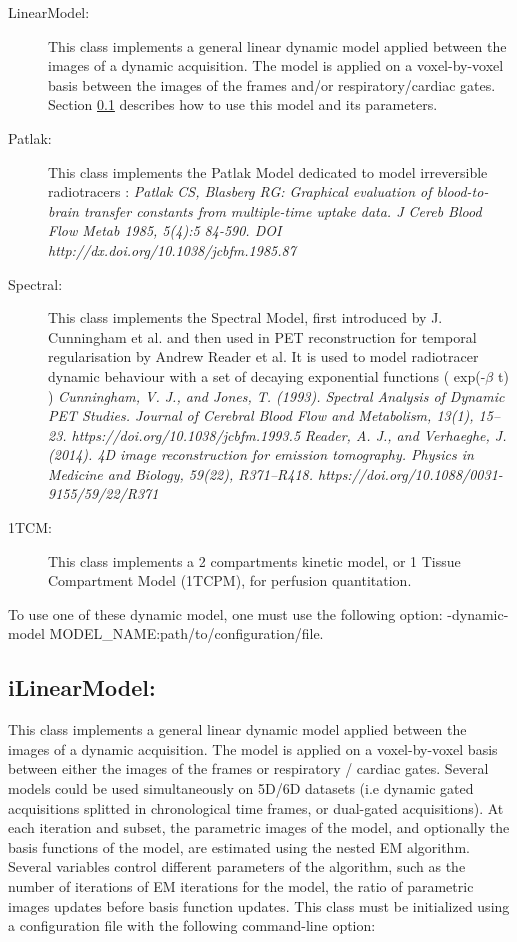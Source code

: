 \documentclass[a4paper, 11pt]{article}
\begin{document}
\begin{description}
  \item[LinearModel:]
This class implements a general linear dynamic model applied between the images of a dynamic acquisition. The model is applied on a voxel-by-voxel basis between the images of the frames and/or respiratory/cardiac gates. Section \ref{ss_lmodel} describes how to use this model and its parameters.

  \item[Patlak:]
This class implements the Patlak Model dedicated to model irreversible radiotracers : \textit{Patlak CS, Blasberg RG: Graphical evaluation of blood-to-brain transfer constants from multiple-time uptake data. J Cereb Blood Flow Metab 1985, 5(4):5 84-590. \newline DOI http://dx.doi.org/10.1038/jcbfm.1985.87}

  \item[Spectral:]
This class implements the Spectral Model, first introduced by J. Cunningham et al. and then used in PET reconstruction for temporal regularisation by Andrew Reader et al. It is used to model radiotracer dynamic behaviour with a set of decaying exponential functions ( exp(-$\beta$ t) )
\textit {Cunningham, V. J., and Jones, T. (1993). Spectral Analysis of Dynamic PET Studies. Journal of Cerebral Blood Flow and Metabolism, 13(1), 15–23. https://doi.org/10.1038/jcbfm.1993.5}
\textit {Reader, A. J., and Verhaeghe, J. (2014). 4D image reconstruction for emission tomography. Physics in Medicine and Biology, 59(22), R371–R418. https://doi.org/10.1088/0031-9155/59/22/R371}


  \item[1TCM:]
This class implements a 2 compartments kinetic model, or 1 Tissue Compartment Model (1TCPM), for perfusion quantitation.
\end{description}

To use one of these dynamic model, one must use the following option: \newline
-dynamic-model MODEL\_NAME:path/to/configuration/file.




\clearpage
\subsection{iLinearModel:}
\label{ss_lmodel}


This class implements a general linear dynamic model applied between the images of a dynamic acquisition. The model is applied on a voxel-by-voxel basis between either the images of the frames or respiratory / cardiac gates. Several models could be used simultaneously on 5D/6D datasets (i.e dynamic gated acquisitions splitted in chronological time frames, or dual-gated acquisitions). At each iteration and subset, the parametric images of the model, and optionally the basis functions of the model, are estimated using the nested EM algorithm. Several variables control different parameters of the algorithm, such as the number of iterations of EM iterations for the model, the ratio of parametric images updates before basis function updates. This class must be initialized using a configuration file with the following command-line option:
\end{document}
